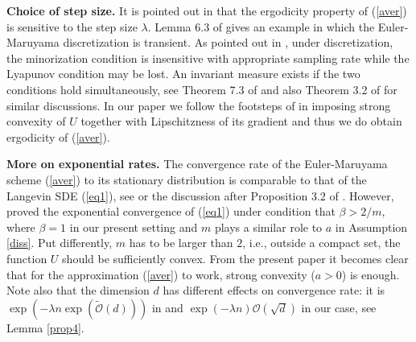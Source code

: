 \documentclass[a4paper]{article}
\begin{document}
\textbf{Choice of step size.} It is pointed out in \cite{Rob1996} that the ergodicity property of (\ref{aver}) is sensitive to the step size $\lambda$. Lemma 6.3 of \cite{mattingly} gives an example in which the Euler-Maruyama discretization is transient. As pointed out in \cite{mattingly}, under discretization, the minorization condition is insensitive with appropriate sampling rate while the Lyapunov condition may be lost. An invariant measure exists if the two conditions hold simultaneously, see Theorem 7.3 of \cite{mattingly} and also Theorem 3.2 of \cite{Rob1996} for similar discussions. In our paper we follow the footsteps of
\cite{dalalyan} in imposing strong convexity of $U$ together with Lipschitzness of its gradient and thus we do obtain ergodicity of (\ref{aver}).

\textbf{More on exponential rates.} The convergence rate of the Euler-Maruyama scheme (\ref{aver}) to its stationary distribution is comparable to that of the Langevin SDE (\ref{eq1}), see \cite{Rob1996} or the discussion after Proposition 3.2 of \cite{raginsky}. However, \cite{raginsky} proved the exponential convergence of
(\ref{eq1}) under condition that $\beta > 2/m$, where $\beta = 1$ in our present setting and $m$ plays a similar role to $a$ in Assumption \ref{diss}. Put differently, $m$ has to be larger than $2$, i.e., outside a compact set, the function $U$ should be sufficiently convex. From the present paper it becomes clear that for the approximation (\ref{aver}) to work, strong convexity ($a>0$) is enough. Note also that the dimension $d$ has different effects on convergence rate: it is $\exp(- \lambda n \exp(\tilde{\mathcal{O}}(d)))$ in \cite{raginsky} and $\exp(-\lambda n) \mathcal{O}(\sqrt{d})$ in our case, see Lemma \ref{prop4}.
\end{document}
